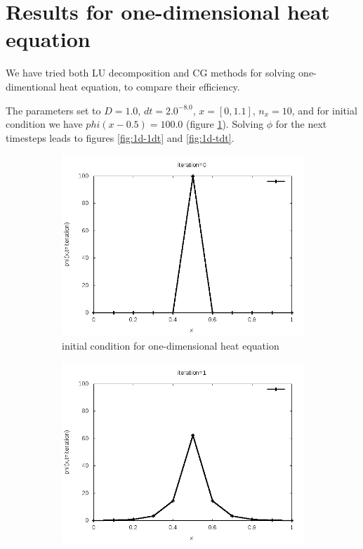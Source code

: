 \section{Results for one-dimensional heat equation}
We have tried both LU decomposition and CG methods for solving one-dimentional heat equation, to compare their efficiency.

The parameters set to $D=1.0$, $dt= 2.0^{-8.0}$, $x=[0,1.1]$, $n_x=10$, and for initial condition we have $phi(x-0.5)=100.0$ (figure \ref{fig:1d-initial_condition}). Solving $\phi$ for the next timesteps leads to figures \ref{fig:1d-1dt} and \ref{fig:1d-tdt}.

\begin{figure}
     \centering
     \begin{subfigure}[b]{0.45\textwidth}
         \centering
         \includegraphics[width=\textwidth]{1Dfig/0}
		\caption{initial condition for one-dimensional heat equation}
         \label{fig:1d-initial_condition}
     \end{subfigure}
     \begin{subfigure}[b]{0.45\textwidth}
         \centering
         \includegraphics[width=\textwidth]{1Dfig/1}

\end{subfigure}
\end{figure}
